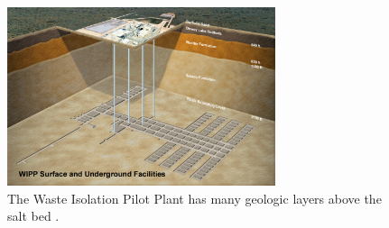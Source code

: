 \begin{figure}[htbp!]
  \begin{center}
    \includegraphics[width=0.7\textwidth]{./images/wipp_stratigraph.eps}
  \end{center}
  \caption{The Waste Isolation Pilot Plant has many geologic layers above the 
    salt bed \cite{doe_wipp_2013}.}
  \label{fig:wipp}
\end{figure}
